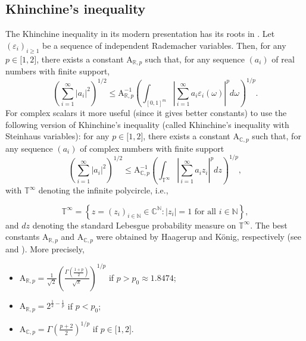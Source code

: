 \documentclass[10pt]{amsart}
\numberwithin{equation}{section}
\begin{document}
\subsection{Khinchine's inequality}

The Khinchine inequality in its modern presentation has its roots in \cite{zyg}. Let $(\varepsilon _{i})_{i\geq 1}$ be a sequence of independent
Rademacher variables. Then, for any $p\in \lbrack 1,2]$, there exists a
constant $\mathrm{A}_{\mathbb{R},p}$ such that, for any sequence $(a_{i})$
of real numbers with finite support,
\begin{equation*}
\left( \sum_{i=1}^{ \infty }|a_{i}|^{2}\right) ^{1/2}\leq \mathrm{A}_{\mathbb{R},p}^{-1}\left( \int_{[0,1]^m }\left\vert \sum_{i=1}^{ \infty
}a_{i}\varepsilon _{i}(\omega )\right\vert ^{p}d\omega \right) ^{1/p}.
\end{equation*}For complex scalars it more useful (since it gives better constants) to use
the following version of Khinchine's inequality (called Khinchine's
inequality with Steinhaus variables): for any $p\in \lbrack 1,2]$, there
exists a constant $\mathrm{A}_{\mathbb{C},p}$ such that, for any sequence $(a_{i})$ of complex numbers with finite support
\begin{equation*}
\left( \sum_{i=1}^{ \infty }|a_{i}|^{2}\right) ^{1/2}\leq \mathrm{A}_{\mathbb{C},p}^{-1}\left( \int_{\mathbb{T}^{\infty }}\left\vert \sum_{i=1}^{
\infty }a_{i}z_{i}\right\vert ^{p}dz\right) ^{1/p},
\end{equation*}with $\mathbb{T}^{\infty }$ denoting the infinite polycircle, i.e.,

\begin{equation*}
\mathbb{T}^{\infty }=\left\{ z=\left( z_{i}\right) _{i\in \mathbb{N}}\in
\mathbb{C}^{\mathbb{N}}:\left\vert z_{i}\right\vert =1\text{ for all }i\in
\mathbb{N}\right\},
\end{equation*}and $dz$ denoting the standard Lebesgue probability measure on $\mathbb{T}^{\infty }$. The best constants $\mathrm{A}_{\mathbb{R},p}$ and $\mathrm{A}_{\mathbb{C},p}$ were obtained by Haagerup and K\"{o}nig, respectively (see
\cite{Haa} and \cite{KKw}). More precisely,

\begin{itemize}
\item $\mathrm{A}_{\mathbb{R},p}=\frac{1}{\sqrt{2}}\left( \frac{\Gamma
\left( \frac{1+p}{2}\right) }{\sqrt{\pi }}\right) ^{1/p}$ if $p>p_{0}\approx
1.8474$;

\item $\mathrm{A}_{\mathbb{R},p}=2^{\frac{1}{2}-\frac{1}{p}}$ if $p<p_{0}$;

\item $\mathrm{A}_{\mathbb{C},p}=\Gamma \left( \frac{p+2}{2}\right) ^{1/p}$
if $p\in \lbrack 1,2]$.
\end{itemize}
\end{document}
